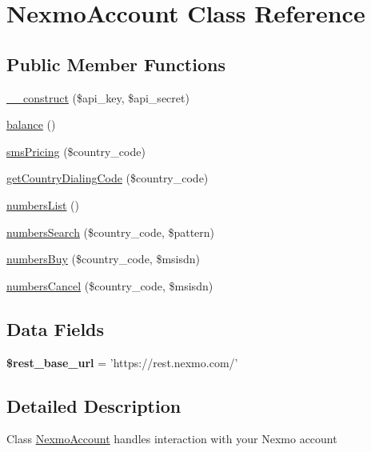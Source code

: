 \hypertarget{class_nexmo_account}{\section{Nexmo\-Account Class Reference}
\label{class_nexmo_account}
}
\subsection*{Public Member Functions}
\begin{DoxyCompactItemize}
\item 
\hyperlink{class_nexmo_account_a7d426b1d1f3cd445dc97589d1e84f893}{\-\_\-\-\_\-construct} (\$api\-\_\-key, \$api\-\_\-secret)
\item 
\hyperlink{class_nexmo_account_a34eb355a99d1b2b84c43b6029a27d0bf}{balance} ()
\item 
\hyperlink{class_nexmo_account_a9b4ce828a395f91bcef9318e9ce7b77a}{sms\-Pricing} (\$country\-\_\-code)
\item 
\hyperlink{class_nexmo_account_ade84cd59a69533f1970926e32467f1dd}{get\-Country\-Dialing\-Code} (\$country\-\_\-code)
\item 
\hyperlink{class_nexmo_account_ab4afbcbe17c89bb4ed1ea8b2da0054e5}{numbers\-List} ()
\item 
\hyperlink{class_nexmo_account_aa502abbcb730c72facf31b208001f7f6}{numbers\-Search} (\$country\-\_\-code, \$pattern)
\item 
\hyperlink{class_nexmo_account_a208d64d12310cdb4fb31c1d0a2f50db1}{numbers\-Buy} (\$country\-\_\-code, \$msisdn)
\item 
\hyperlink{class_nexmo_account_a37333c4010c4491c02bedd04f74f45f8}{numbers\-Cancel} (\$country\-\_\-code, \$msisdn)
\end{DoxyCompactItemize}
\subsection*{Data Fields}
\begin{DoxyCompactItemize}
\item 
\hypertarget{class_nexmo_account_a4e84295667725019564d9fdbb651c607}{{\bfseries \$rest\-\_\-base\-\_\-url} = 'https\-://rest.\-nexmo.\-com/'}\label{class_nexmo_account_a4e84295667725019564d9fdbb651c607}

\end{DoxyCompactItemize}


\subsection{Detailed Description}
Class \hyperlink{class_nexmo_account}{Nexmo\-Account} handles interaction with your Nexmo account


